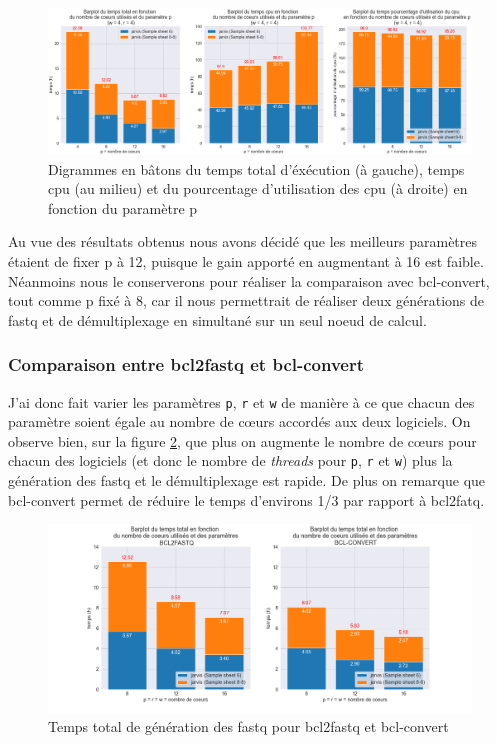 \begin{figure}[H]
    \centering
    \includegraphics[width=1\textwidth]{img/barplot_cum_jarvis1.png}
    \caption{\footnotesize{Digrammes en bâtons du temps total d'éxécution (à gauche), temps cpu (au milieu) et du pourcentage d'utilisation des cpu (à droite) en fonction du paramètre p}}
    \label{barplot-param2}
\end{figure}

Au vue des résultats obtenus nous avons décidé que les meilleurs paramètres étaient de fixer p à 12, puisque le gain apporté en augmentant à 16 est faible. Néanmoins nous le conserverons pour réaliser la comparaison avec bcl-convert, tout comme p fixé à 8, car il nous permettrait de réaliser deux générations de fastq et de démultiplexage en simultané sur un seul noeud de calcul.\\

\subsubsection{Comparaison entre bcl2fastq et bcl-convert}
J'ai donc fait varier les paramètres \texttt{p}, \texttt{r} et \texttt{w} de manière à ce que chacun des paramètre soient égale au nombre de cœurs accordés aux deux logiciels. On observe bien, sur la figure \ref{fig-total-time}, que plus on augmente le nombre de cœurs pour chacun des logiciels (et donc le nombre de \emph{threads} pour \texttt{p}, \texttt{r} et \texttt{w}) plus la génération des fastq et le démultiplexage est rapide. De plus on remarque que bcl-convert permet de réduire le temps d'environs 1/3 par rapport à bcl2fatq. 

\begin{figure}[H]
    \centering
    \includegraphics[width=1\textwidth]{img/barplot_total_time_comp.png}
    \caption{\footnotesize{Temps total de génération des fastq pour bcl2fastq et bcl-convert}}
    \label{fig-total-time}
\end{figure}

